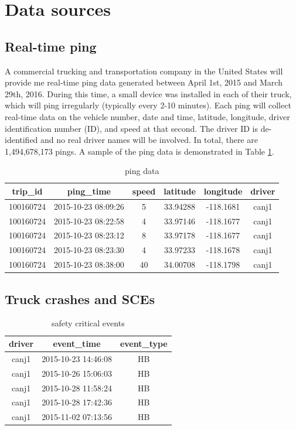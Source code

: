\documentclass[12pt]{book}
\numberwithin{equation}{chapter}
\begin{document}
\hypertarget{data-sources}{%
\section{Data sources}\label{data-sources}}

\hypertarget{real-time-ping}{%
\subsection{Real-time ping}\label{real-time-ping}}

A commercial trucking and transportation company in the United States will provide me real-time ping data generated between April 1st, 2015 and March 29th, 2016. During this time, a small device was installed in each of their truck, which will ping irregularly (typically every 2-10 minutes). Each ping will collect real-time data on the vehicle number, date and time, latitude, longitude, driver identification number (ID), and speed at that second. The driver ID is de-identified and no real driver names will be involved. In total, there are 1,494,678,173 pings. A sample of the ping data is demonstrated in Table \ref{tab:ping}.

\begin{table}[!h]

\caption{\label{tab:ping}ping data}
\centering
\begin{tabular}{cccccc}
\toprule
trip\_id & ping\_time & speed & latitude & longitude & driver\\
\midrule
100160724 & 2015-10-23 08:09:26 & 5 & 33.94288 & -118.1681 & canj1\\
100160724 & 2015-10-23 08:22:58 & 4 & 33.97146 & -118.1677 & canj1\\
100160724 & 2015-10-23 08:23:12 & 8 & 33.97178 & -118.1677 & canj1\\
100160724 & 2015-10-23 08:23:30 & 4 & 33.97233 & -118.1678 & canj1\\
100160724 & 2015-10-23 08:38:00 & 40 & 34.00708 & -118.1798 & canj1\\
\bottomrule
\end{tabular}
\end{table}

\hypertarget{truck-crashes-and-sces}{%
\subsection{Truck crashes and SCEs}\label{truck-crashes-and-sces}}

\begin{table}
\caption{\label{tab:SCE}safety critical events}
\centering
\begin{tabular}{ccc}
\toprule
driver & event\_time & event\_type\\
\midrule
canj1 & 2015-10-23 14:46:08 & HB\\
canj1 & 2015-10-26 15:06:03 & HB\\
canj1 & 2015-10-28 11:58:24 & HB\\
canj1 & 2015-10-28 17:42:36 & HB\\
canj1 & 2015-11-02 07:13:56 & HB\\
\bottomrule
\end{tabular}
\end{table}
\end{document}
